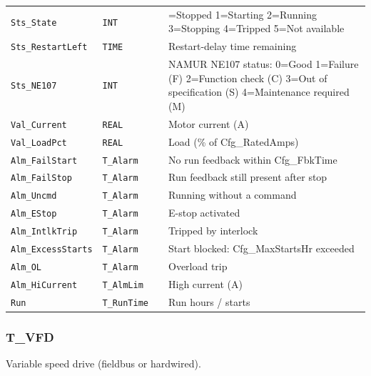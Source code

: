 {\begin{longtable}{@{}>{\raggedright\arraybackslash}p{3.4cm}>{\raggedright\arraybackslash}p{3.3cm}>{\raggedright\arraybackslash}p{1.3cm}>{\raggedright\arraybackslash}p{6.4cm}@{}}
\texttt{Sts\_State} & \texttt{INT} &  & 0=Stopped 1=Starting 2=Running 3=Stopping 4=Tripped 5=Not available \\
\texttt{Sts\_RestartLeft} & \texttt{TIME} &  & Restart-delay time remaining \\
\texttt{Sts\_NE107} & \texttt{INT} &  & NAMUR NE107 status: 0=Good 1=Failure (F) 2=Function check (C) 3=Out of specification (S) 4=Maintenance required (M) \\
\texttt{Val\_Current} & \texttt{REAL} &  & Motor current (A) \\
\texttt{Val\_LoadPct} & \texttt{REAL} &  & Load (\% of Cfg\_RatedAmps) \\
\texttt{Alm\_FailStart} & \texttt{T\_Alarm} &  & No run feedback within Cfg\_FbkTime \\
\texttt{Alm\_FailStop} & \texttt{T\_Alarm} &  & Run feedback still present after stop \\
\texttt{Alm\_Uncmd} & \texttt{T\_Alarm} &  & Running without a command \\
\texttt{Alm\_EStop} & \texttt{T\_Alarm} &  & E-stop activated \\
\texttt{Alm\_IntlkTrip} & \texttt{T\_Alarm} &  & Tripped by interlock \\
\texttt{Alm\_ExcessStarts} & \texttt{T\_Alarm} &  & Start blocked: Cfg\_MaxStartsHr exceeded \\
\texttt{Alm\_OL} & \texttt{T\_Alarm} &  & Overload trip \\
\texttt{Alm\_HiCurrent} & \texttt{T\_AlmLim} &  & High current (A) \\
\texttt{Run} & \texttt{T\_RunTime} &  & Run hours /\allowbreak{} starts \\
\bottomrule
\end{longtable}
}
\subsubsection*{T\_VFD}
\label{app:pclib:tvfd}
Variable speed drive (fieldbus or hardwired).

